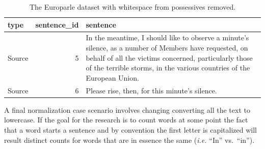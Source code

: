 \documentclass[
  letterpaper,
]{scrbook}
\begin{document}
\hypertarget{tbl-normalize-whitespace-remove-europarle}{}
\begin{table}
\caption{\label{tbl-normalize-whitespace-remove-europarle}The Europarle dataset with whitespace from possessives removed. }\tabularnewline

\centering
\begin{tabular}{lrl}
\toprule
type & sentence\_id & sentence\\
\midrule
Source & 5 & In the meantime, I should like to observe a minute's silence, as a number of Members have requested, on behalf of all the victims concerned, particularly those of the terrible storms, in the various countries of the European Union.\\
Source & 6 & Please rise, then, for this minute's silence.\\
\bottomrule
\end{tabular}
\end{table}

A final normalization case scenario involves changing converting all the
text to lowercase. If the goal for the research is to count words at
some point the fact that a word starts a sentence and by convention the
first letter is capitalized will result distinct counts for words that
are in essence the same (\emph{i.e.} ``In'' vs.~``in'').
\end{document}
